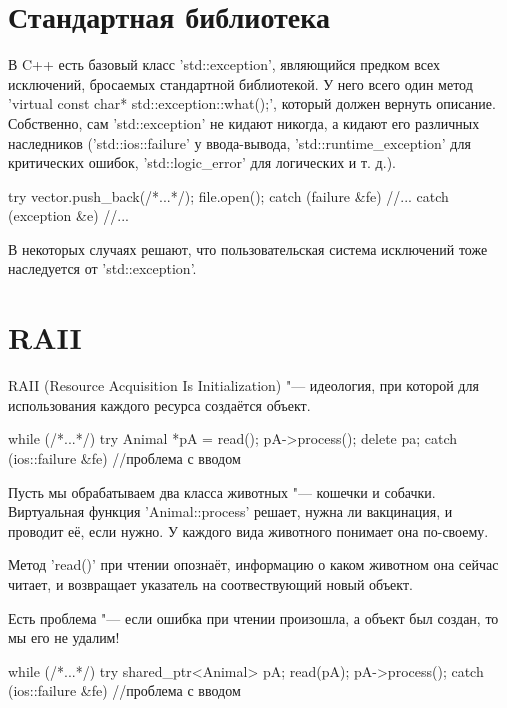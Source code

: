 \section{Стандартная библиотека}

В C++ есть базовый класс \cpp'std::exception', являющийся предком всех исключений, бросаемых стандартной библиотекой.
У него всего один метод \cpp'virtual const char* std::exception::what();', который должен вернуть описание.
Собственно, сам \cpp'std::exception' не кидают никогда, а кидают его различных наследников 
(\cpp'std::ios::failure' у ввода-вывода, \cpp'std::runtime_exception' для критических ошибок, \cpp'std::logic_error' для логических и т. д.).

\begin{cppcode}
try {
	vector.push_back(/*...*/);
	file.open();
}
catch (failure &fe) {
	//...
}
catch (exception &e) {
	//...
}
\end{cppcode}

В некоторых случаях решают, что пользовательская система исключений тоже наследуется от \cpp'std::exception'.

\section{RAII}

RAII (Resource Acquisition Is Initialization) "--- идеология, при которой для использования каждого ресурса создаётся объект.
\begin{cppcode}
while (/*...*/)
	try {
		Animal *pA = read();
		pA->process();
		delete pa;
	}
	catch (ios::failure &fe) {
		//проблема с вводом
	}
\end{cppcode}

Пусть мы обрабатываем два класса животных "--- кошечки и собачки.
Виртуальная функция \cpp'Animal::process' решает, нужна ли вакцинация, и проводит её, если нужно.
У каждого вида животного понимает она по-своему.

Метод \cpp'read()' при чтении опознаёт, информацию о каком животном она сейчас читает, и возвращает указатель на соотвествующий новый объект.

Есть проблема "--- если ошибка при чтении произошла, а объект был создан, то мы его не удалим!

\begin{cppcode}
while (/*...*/)
	try {
		shared_ptr<Animal> pA;
		read(pA);
		pA->process();
	}
	catch (ios::failure &fe) {
		//проблема с вводом
	}
\end{cppcode}

